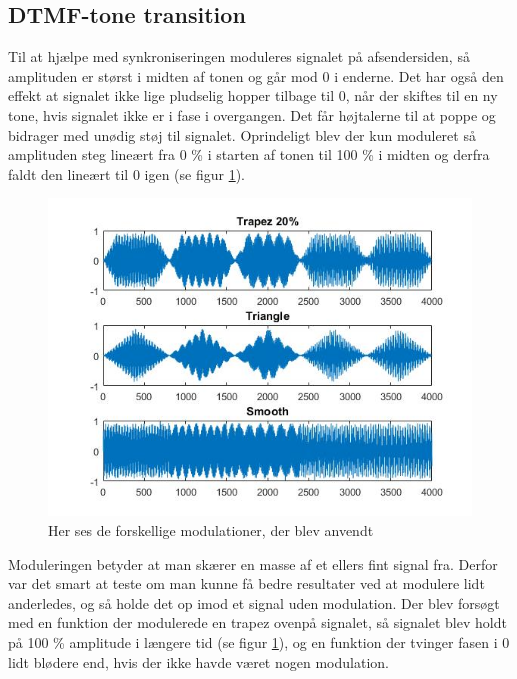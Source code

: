 \subsection{DTMF-tone transition} \label{sec:ToneTransition}

Til at hjælpe med synkroniseringen moduleres signalet på afsendersiden, så amplituden er størst i midten af tonen og går mod 0 i enderne. Det har også den effekt at signalet ikke lige pludselig hopper tilbage til 0, når der skiftes til en ny tone, hvis signalet ikke er i fase i overgangen. Det får højtalerne til at poppe og bidrager med unødig støj til signalet. Oprindeligt blev der kun moduleret så amplituden steg lineært fra 0 \% i starten af tonen til 100 \% i midten og derfra faldt den lineært til 0 igen (se figur \ref{fig:modulation}). 

\begin{figure}[h!]
\centering
\includegraphics[scale=0.6]{Billeder/Modulation.PNG}
\caption{Her ses de forskellige modulationer, der blev anvendt}
\label{fig:modulation}
\end{figure} 

Moduleringen betyder at man skærer en masse af et ellers fint signal fra. Derfor var det smart at teste om man kunne få bedre resultater ved at modulere lidt anderledes, og så holde det op imod et signal uden modulation. Der blev forsøgt med en funktion der modulerede en trapez ovenpå signalet, så signalet blev holdt på 100 \% amplitude i længere tid (se figur \ref{fig:modulation}), og en funktion der tvinger fasen i 0 lidt blødere end, hvis der ikke havde været nogen modulation. 

